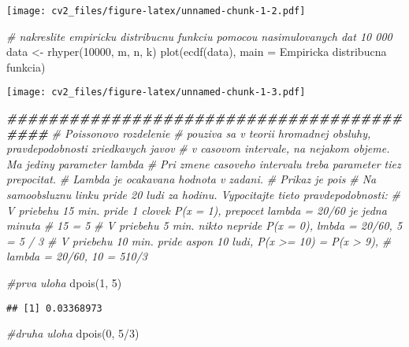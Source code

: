 \documentclass[
]{article}
\newenvironment{Shaded}{\begin{snugshade}}{\end{snugshade}}
\newcommand{\AttributeTok}[1]{\textcolor[rgb]{0.77,0.63,0.00}{#1}}
\newcommand{\CommentTok}[1]{\textcolor[rgb]{0.56,0.35,0.01}{\textit{#1}}}
\newcommand{\DecValTok}[1]{\textcolor[rgb]{0.00,0.00,0.81}{#1}}
\newcommand{\DocumentationTok}[1]{\textcolor[rgb]{0.56,0.35,0.01}{\textbf{\textit{#1}}}}
\newcommand{\FunctionTok}[1]{\textcolor[rgb]{0.00,0.00,0.00}{#1}}
\newcommand{\NormalTok}[1]{#1}
\newcommand{\OtherTok}[1]{\textcolor[rgb]{0.56,0.35,0.01}{#1}}
\newcommand{\SpecialCharTok}[1]{\textcolor[rgb]{0.00,0.00,0.00}{#1}}
\newcommand{\StringTok}[1]{\textcolor[rgb]{0.31,0.60,0.02}{#1}}
\begin{document}
\texttt{[image: cv2\_files/figure-latex/unnamed-chunk-1-2.pdf]}

\begin{Shaded}
\begin{Highlighting}[]
\CommentTok{\# nakreslite empiricku distribucnu funkciu pomocou nasimulovanych dat 10 000}
\NormalTok{data }\OtherTok{\textless{}{-}} \FunctionTok{rhyper}\NormalTok{(}\DecValTok{10000}\NormalTok{, m, n, k)}
\FunctionTok{plot}\NormalTok{(}\FunctionTok{ecdf}\NormalTok{(data), }\AttributeTok{main =} \StringTok{\textquotesingle{}Empiricka distribucna funkcia\textquotesingle{}}\NormalTok{)}
\end{Highlighting}
\end{Shaded}

\texttt{[image: cv2\_files/figure-latex/unnamed-chunk-1-3.pdf]}

\begin{Shaded}
\begin{Highlighting}[]
\DocumentationTok{\#\#\#\#\#\#\#\#\#\#\#\#\#\#\#\#\#\#\#\#\#\#\#\#\#\#\#\#\#\#\#\#\#\#\#\#\#\#\#\#\#\#}
\CommentTok{\# Poissonovo rozdelenie}
\CommentTok{\# pouziva sa v teorii hromadnej obsluhy, pravdepodobnosti zriedkavych javov}
\CommentTok{\# v casovom intervale, na nejakom objeme. Ma jediny parameter lambda}
\CommentTok{\# Pri zmene casoveho intervalu treba parameter tiez prepocitat.}
\CommentTok{\# Lambda je ocakavana hodnota v zadani.}
\CommentTok{\# Prikaz je pois}
\CommentTok{\# Na samoobsluznu linku pride 20 ludi za hodinu. Vypocitajte tieto pravdepodobnosti:}
\CommentTok{\# V priebehu 15 min. pride 1 clovek P(x = 1), prepocet lambda = 20/60 je jedna minuta}
\CommentTok{\# 15 = 5}
\CommentTok{\# V priebehu 5 min. nikto nepride P(x = 0), lmbda = 20/60, 5 = 5 / 3}
\CommentTok{\# V priebehu 10 min. pride aspon 10 ludi, P(x \textgreater{}= 10) = P(x \textgreater{} 9),}
\CommentTok{\# lambda = 20/60, 10 = 510/3}

\CommentTok{\#prva uloha}
\FunctionTok{dpois}\NormalTok{(}\DecValTok{1}\NormalTok{, }\DecValTok{5}\NormalTok{)}
\end{Highlighting}
\end{Shaded}

\begin{verbatim}
## [1] 0.03368973
\end{verbatim}

\begin{Shaded}
\begin{Highlighting}[]
\CommentTok{\#druha uloha}
\FunctionTok{dpois}\NormalTok{(}\DecValTok{0}\NormalTok{, }\DecValTok{5}\SpecialCharTok{/}\DecValTok{3}\NormalTok{)}
\end{Highlighting}
\end{Shaded}
\end{document}
